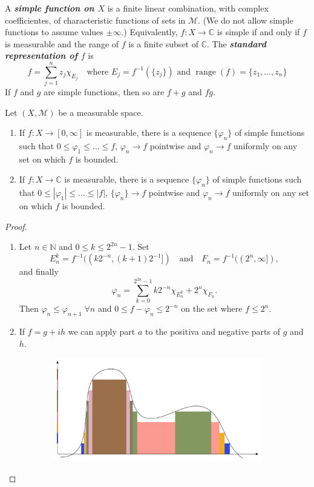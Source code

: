 \documentclass{article}
\theoremstyle{definition}
\numberwithin{equation}{section}
\newcommand{\N}{\mathbb{N}}
\newcommand{\C}{\mathbb{C}}
\begin{document}
\begin{itemize}
		A \textbf{\textit{simple function on $X$}} is a finite linear combination, with complex coefficientes, of characteristic functions of sets in $\mathcal{M}$. (We do not allow simple functions to assume values $\pm\infty$.) Equivalently, $f:X\to\C$ is simple if and only if $f$ is measurable and the range of $f$ is a finite subset of $\C$. The \textbf{\textit{standard representation of $f$}} is
		\[f=\sum_{j=1}^nz_j\chi_{E_j}\quad\text{where }E_j=f^{-1}(\{z_j\})\text{ and }\operatorname{range}(f)=\{z_1,\ldots,z_n\}\]
		If $f$ and $g$ are simple functions, then so are $f+g$ and $fg$.
		\begin{thm}
			Let $(X,\mathcal{M})$ be a measurable space.
			\begin{enumerate}
				\item If $f:X\to[0,\infty]$ is measurable, there is a sequence $\{\varphi_n\}$ of simple functions such that $0\leq\varphi_1\leq\ldots\leq f$, $\varphi_n\to f$ pointwise and $\varphi_n\to f$ uniformly on any set on which $f$ is bounded.
				\item If $f:X\to\C$ is measurable, there is a sequence $\{\varphi_n\}$ of simple functions such that $0\leq|\varphi_1|\leq\ldots\leq|f|$, $\{\varphi_n\}\to f$ pointwise and $\varphi_n\to f$ uniformly on any set on which $f$ is bounded.
			\end{enumerate}
		\end{thm}
		\begin{proof}\leavevmode
			\begin{enumerate}
				\item Let $n\in\N$ and $0\leq k\leq 2^{2n}-1$. Set
				\[E^k_n=f^{-1}((k2^{-n},(k+1)2^{-1}])\quad\text{and}\quad F_n=f^{-1}((2^n,\infty]),\]
				and finally
				\[\varphi_n=\sum_{k=0}^{2^{2n}-1}k2^{-n}\chi_{E^k_n}+2^n\chi_{F_n}.\]
				Then $\varphi_n\leq\varphi_{n+1}\;\forall n$ and $0\leq f-\varphi_n\leq 2^{-n}$ on the set where $f\leq 2^n$.
				\item If $f=g+ih$ we can apply part $a$ to the positiva and negative parts of $g$ and $h$.
			\end{enumerate}
			\begin{figure}[H]
	\begin{center}
		\begin{subfigure}{\linewidth}
	\centering
	\includegraphics[width=1\linewidth]{fig1}

\end{subfigure}
\end{center}
\end{figure}
\end{proof}
\end{itemize}
\end{document}
